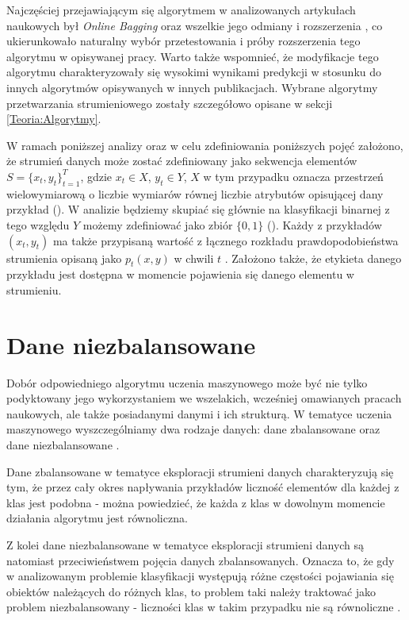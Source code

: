 Najczęściej przejawiającym się algorytmem w analizowanych artykułach naukowych był \textit{Online Bagging} oraz wszelkie jego odmiany i rozszerzenia \cite{Article:TypyPrzykladow}\cite{Article:ManyAlgorithms}\cite{Article:OBFirst}\cite{Article:OBSecond}, co ukierunkowało naturalny wybór przetestowania i próby rozszerzenia tego algorytmu w opisywanej pracy. Warto także wspomnieć, że modyfikacje tego algorytmu charakteryzowały się wysokimi wynikami predykcji w stosunku do innych algorytmów opisywanych w innych publikacjach. Wybrane algorytmy przetwarzania strumieniowego zostały szczegółowo opisane w sekcji \ref{Teoria:Algorytmy}.

W ramach poniższej analizy oraz w celu zdefiniowania poniższych pojęć założono, że strumień danych może zostać zdefiniowany jako sekwencja elementów $S = \{x_t, y_t\}^{T}_{t=1}$, gdzie $x_t \in X$, $y_t \in Y$, $X$ w tym przypadku oznacza przestrzeń wielowymiarową o liczbie wymiarów równej liczbie atrybutów opisującej dany przykład (). W analizie będziemy skupiać się głównie na klasyfikacji binarnej z tego względu $Y$ możemy zdefiniować jako zbiór $\{0,1\}$ (). Każdy z przykładów $(x_t, y_t)$ ma także przypisaną wartość z łącznego rozkładu prawdopodobieństwa strumienia opisaną jako $p_t(x,y)$ w chwili $t$ \cite{Article:TypyPrzykladow}. Założono także, że etykieta danego przykładu jest dostępna w momencie pojawienia się danego elementu w strumieniu.

\section{Dane niezbalansowane}

\noindent Dobór odpowiedniego algorytmu uczenia maszynowego może być nie tylko podyktowany jego wykorzystaniem we wszelakich, wcześniej omawianych pracach naukowych, ale także posiadanymi danymi i ich strukturą. W tematyce uczenia maszynowego wyszczególniamy dwa rodzaje danych: dane zbalansowane oraz dane niezbalansowane \cite{Article:Inz}.

Dane zbalansowane w tematyce eksploracji strumieni danych charakteryzują się tym, że przez cały okres napływania przykładów liczność elementów dla każdej z klas jest podobna - można powiedzieć, że każda z klas w dowolnym momencie działania algorytmu jest równoliczna.

Z kolei dane niezbalansowane w tematyce eksploracji strumieni danych są natomiast przeciwieństwem pojęcia danych zbalansowanych. Oznacza to, że gdy w analizowanym problemie klasyfikacji występują różne częstości pojawiania się obiektów należących do różnych klas, to problem taki należy traktować jako problem niezbalansowany - liczności klas w takim przypadku nie są równoliczne \cite{Article:Inz}.

